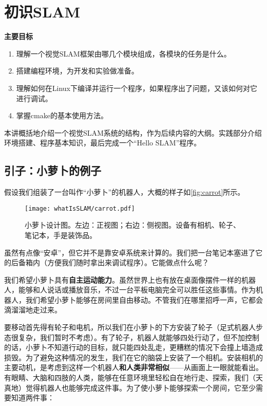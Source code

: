 \chapter{初识SLAM}
\begin{mdframed}
	\textbf{主要目标}
	\begin{enumerate}[labelindent=0em,leftmargin=1.5em]
		\item 理解一个视觉SLAM框架由哪几个模块组成，各模块的任务是什么。
		\item 搭建编程环境，为开发和实验做准备。
		\item 理解如何在Linux下编译并运行一个程序，如果程序出了问题，又该如何对它进行调试。
		\item 掌握cmake的基本使用方法。
	\end{enumerate}
\end{mdframed}

本讲概括地介绍一个视觉SLAM系统的结构，作为后续内容的大纲。实践部分介绍环境搭建、程序基本知识，最后完成一个“Hello SLAM”程序。
\newpage


\newpage

\section{引子：小萝卜的例子}
假设我们组装了一台叫作“小萝卜”的机器人，大概的样子如\autoref{fig:carrot}所示。%

\begin{figure}[!ht]
	\centering
	\texttt{[image: whatIsSLAM/carrot.pdf]}
	\caption{小萝卜设计图。左边：正视图；右边：侧视图。设备有相机、轮子、笔记本，手是装饰品。}
	\label{fig:carrot}
\end{figure}

虽然有点像“安卓”，但它并不是靠安卓系统来计算的。我们把一台笔记本塞进了它的后备箱内（方便我们随时拿出来调试程序）。它能做点什么呢？

我们希望小萝卜具有\textbf{自主运动能力}。虽然世界上也有放在桌面像摆件一样的机器人，能够和人说话或播放音乐，不过一台平板电脑完全可以胜任这些事情。作为机器人，我们希望小萝卜能够在房间里自由移动。不管我们在哪里招呼一声，它都会滴溜溜地走过来。

要移动首先得有轮子和电机，所以我们在小萝卜的下方安装了轮子（足式机器人步态很复杂，我们暂时不考虑）。有了轮子，机器人就能够四处行动了，但不加控制的话，小萝卜不知道行动的目标，就只能四处乱走，更糟糕的情况下会撞上墙造成损毁。为了避免这种情况的发生，我们在它的脑袋上安装了一个相机。安装相机的主要动机，是考虑到这样一个机器人\textbf{和人类非常相似}——从画面上一眼就能看出。有眼睛、大脑和四肢的人类，能够在任意环境里轻松自在地行走、探索，我们（天真地）觉得机器人也能够完成这件事。为了使小萝卜能够探索一个房间，它至少需要知道两件事：

